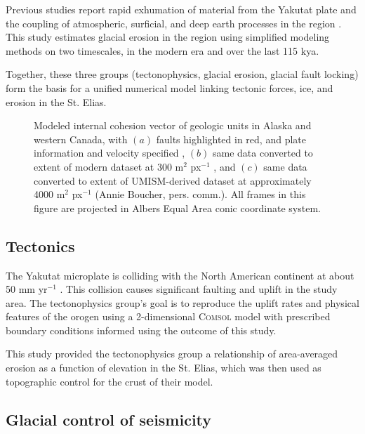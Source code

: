 \documentclass[twocolumn]{aastex6}
\begin{document}
		Previous studies report rapid exhumation of material from the Yakutat plate \citep{Sheaf2003,Spotila2004,Enkelmann2008,Berger2008,Enkelmann2009,Enkelmann2015} and the coupling of atmospheric, surficial, and deep earth processes in the region \citep{Elmore2013,Enkelmann2015,Gulick2015,Montelli2017}. This study estimates glacial erosion in the region using simplified modeling methods on two timescales, in the modern era and over the last 115 kya.
		
		Together, these three groups (tectonophysics, glacial erosion, glacial fault locking) form the basis for a unified numerical model linking tectonic forces, ice, and erosion in the St. Elias.


		\begin{figure*}[tb]
			\caption{\label{f:cohesion} Modeled internal cohesion vector of geologic units in Alaska and western Canada, with $(a)$ faults highlighted in red, and plate information and velocity specified \citep{Christeson2010,Marechal2015}, $(b)$ same data converted to extent of modern dataset at 300 m$^2$ px$^{-1}$ \citep{Altena2018}, and $(c)$ same data converted to extent of UMISM-derived dataset at approximately 4000 m$^2$ px$^{-1}$ (Annie Boucher, pers. comm.). All frames in this figure are projected in Albers Equal Area conic coordinate system.}
		\end{figure*}
		
	\subsection{Tectonics}
		The Yakutat microplate is colliding with the North American continent at about 50 mm yr$^{-1}$ \citep{Marechal2015}. This collision causes significant faulting and uplift in the study area. The tectonophysics group's goal is to reproduce the uplift rates and physical features of the orogen using a 2-dimensional \textsc{Comsol} model with prescribed boundary conditions informed using the outcome of this study.
		
		This study provided the tectonophysics group a relationship of area-averaged erosion as a function of elevation in the St. Elias, which was then used as topographic control for the crust of their model.
		
	\subsection{Glacial control of seismicity}
		
\end{document}
